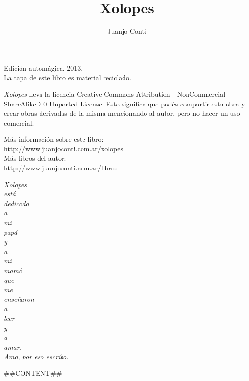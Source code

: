 \documentclass[12pt,twoside,openright,a5paper]{book}
\title{Xolopes}
\author{Juanjo Conti}
\date{}
\begin{document}
\pagestyle{plain}

\maketitle

\cleardoublepage

\thispagestyle{empty}
\noindent
Edición automágica. 2013.\\
La tapa de este libro es material reciclado.

\vspace{0.5cm}

\noindent
\emph{Xolopes} lleva la licencia 
Creative Commons Attribution - NonCommercial - ShareAlike 3.0 Unported License.
Esto significa que podés compartir esta obra y crear obras derivadas de la misma
mencionando al autor, pero no ha\-cer un uso comercial.

\vfill

\noindent
Más información sobre este libro:\\
http://www.juanjoconti.com.ar/xolopes\\

\noindent
Más libros del autor:\\
http://www.juanjoconti.com.ar/libros

\cleardoublepage

\noindent
\begin{flushright}
\emph{
\emph{Xolopes} \\está \\dedicado \\a \\mi \\papá \\y \\a \\mi \\mamá\\
que \\me \\enseñaron \\a \\leer \\y \\a \\amar.\\
\vspace{0.5cm}
Amo, por eso escribo.
}

\end{flushright}

\cleardoublepage

##CONTENT##
\end{document}
